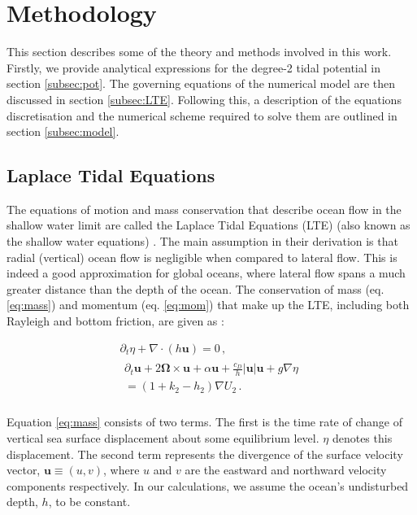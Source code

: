 \section{Methodology}

This section describes some of the theory and methods involved in this work. Firstly, we provide analytical expressions for the degree-2 tidal potential in section \ref{subsec:pot}. The governing equations of the numerical model are then discussed in section \ref{subsec:LTE}. Following this, a description of the equations discretisation and the numerical scheme required to solve them are outlined in section \ref{subsec:model}.

\subsection{Laplace Tidal Equations \label{subsec:LTE}}

The equations of motion and mass conservation that describe ocean flow in the shallow water limit are called the Laplace Tidal Equations (LTE) (also known as the shallow water equations) \citep{lamb1932hydrodynamics}. The main assumption in their derivation is that radial (vertical) ocean flow is negligible when compared to lateral flow. This is indeed a good approximation for global oceans, where lateral flow spans a much greater distance than the depth of the ocean. The conservation of mass (eq. \ref{eq:mass}) and momentum (eq. \ref{eq:mom}) that make up the LTE, including both Rayleigh and bottom friction, are given as \citep{sears1995tidal,tyler2008strong,matsuyama2014tidal}:


\vspace{-0.5cm}
\begin{gather}
\partial_t \eta + \nabla \cdot \left(h \bm{u}\right) = 0\, , \label{eq:mass}\\
\begin{aligned} 
\partial_t \bm{u} + 2 \bm{\Omega} \times \bm{u} + \alpha\bm{u} + \frac{c_D}{h} \left|\bm{u}\right| \bm{u}  + g \nabla \eta \\ = (1 + k_2 - h_2) \nabla U_2 \, . \label{eq:mom}\\
\end{aligned} 
\end{gather}

Equation \ref{eq:mass} consists of two terms. The first is the time rate of change of vertical sea surface displacement about some equilibrium level. $\eta$ denotes this displacement. The second term represents the divergence of the surface velocity vector, $\bm{u} \equiv (u, v)$, where $u$ and $v$ are the eastward and northward velocity components respectively. In our calculations, we assume the ocean's undisturbed depth, $h$, to be constant. 

